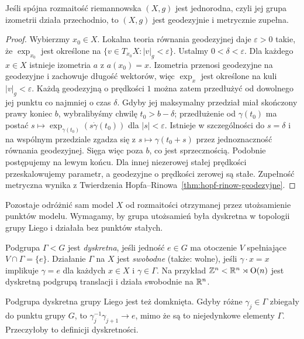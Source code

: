 \begin{stwierdzenie}
\label{prop:klein-jednorodna-zupelna}
Jeśli spójna rozmaitość riemannowska $(X,g)$ jest jednorodna,
czyli jej grupa izometrii działa przechodnio, to $(X,g)$ jest
geodezyjnie i metrycznie zupełna.
\end{stwierdzenie}
\begin{proof}
Wybierzmy $x_0\in X$. Lokalna teoria równania geodezyjnej
daje $\varepsilon>0$ takie, że $\exp_{x_0}$ jest określone
na $\{v\in T_{x_0}X:|v|_g<\varepsilon\}$.
Ustalmy $0<\delta<\varepsilon$. Dla każdego $x\in X$
istnieje izometria $a$ z $a(x_0)=x$. Izometria przenosi
geodezyjne na geodezyjne i zachowuje długość wektorów,
więc $\exp_x$ jest określone na kuli $|v|_g<\varepsilon$.
Każdą geodezyjną o prędkości $1$ można zatem przedłużyć
od dowolnego jej punktu co najmniej o czas $\delta$.
Gdyby jej maksymalny przedział miał skończony prawy koniec $b$,
wybralibyśmy chwilę $t_0>b-\delta$; przedłużenie od
$\gamma(t_0)$ ma postać
$s\mapsto\exp_{\gamma(t_0)}(s\dot\gamma(t_0))$ dla $|s|<\varepsilon$.
Istnieje w szczególności do $s=\delta$ i na wspólnym
przedziale zgadza się z $s\mapsto\gamma(t_0+s)$
przez jednoznaczność równania geodezyjnej.
Sięga więc poza $b$, co jest sprzecznością.
Podobnie postępujemy na lewym końcu. Dla innej niezerowej
stałej prędkości przeskalowujemy parametr, a geodezyjne
o prędkości zerowej są stałe. Zupełność metryczna wynika
z Twierdzenia Hopfa--Rinowa~\ref{thm:hopf-rinow-geodezyjne}.
\end{proof}

Pozostaje odróżnić sam model $X$ od rozmaitości otrzymanej
przez utożsamienie punktów modelu. Wymagamy, by grupa
utożsamień była dyskretna w topologii grupy Liego i działała
bez punktów stałych.

\begin{definicja}
\label{def:klein-dyskretna-swobodna}
Podgrupa $\Gamma<G$ jest \emph{dyskretna}, jeśli jedność
$e\in G$ ma otoczenie $V$ spełniające $V\cap\Gamma=\{e\}$.
Działanie $\Gamma$ na $X$ jest \emph{swobodne} (także: wolne), jeśli
$\gamma\cdot x=x$ implikuje $\gamma=e$ dla każdych
$x\in X$ i $\gamma\in\Gamma$.
Na przykład $\mathbb{Z}^n<\mathbb{R}^n\rtimes\mathrm O(n)$ jest dyskretną
podgrupą translacji i działa swobodnie na $\mathbb{R}^n$.
\end{definicja}

Podgrupa dyskretna grupy Liego jest też domknięta.
Gdyby różne $\gamma_j\in\Gamma$ zbiegały do punktu grupy $G$,
to $\gamma_j^{-1}\gamma_{j+1}\to e$, mimo że są to niejedynkowe
elementy $\Gamma$. Przeczyłoby to definicji dyskretności.

